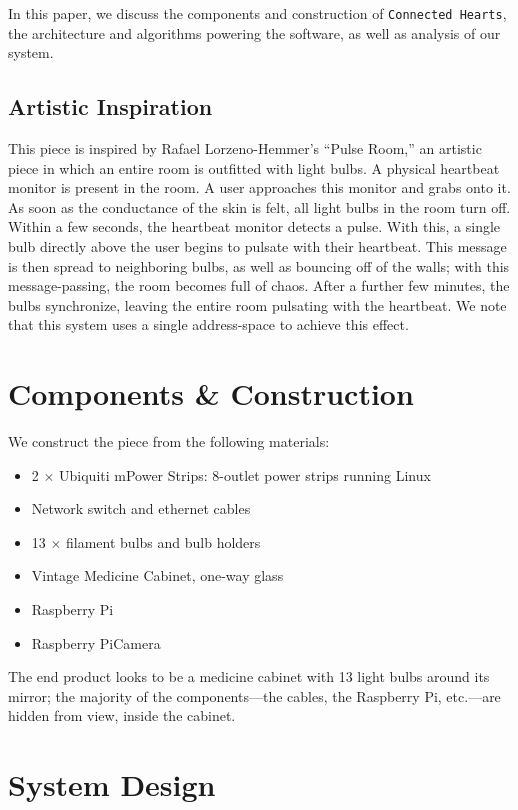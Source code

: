 \documentclass[preprint,review,12pt]{cs262}
\begin{document}
In this paper, we discuss the components and construction of  \texttt{Connected Hearts}, the architecture and algorithms powering the software, as well as analysis of our system. 

\subsection{Artistic Inspiration}

This piece is inspired by Rafael Lorzeno-Hemmer's ``Pulse Room,''\cite{pulse} an artistic piece in which an entire room is outfitted with light bulbs. A physical heartbeat monitor is present in the room. A user approaches this monitor and grabs onto it. As soon as the conductance of the skin is felt, all light bulbs in the room turn off. Within a few seconds, the heartbeat monitor detects a pulse. With this, a single bulb directly above the user begins to pulsate with their heartbeat. This message is then spread to neighboring bulbs, as well as bouncing off of the walls; with this message-passing, the room becomes full of chaos. After a further few minutes, the bulbs synchronize, leaving the entire room pulsating with the heartbeat. We note that this system uses a single address-space to achieve this effect. 


\section{Components \& Construction}

\noindent We construct the piece from the following materials:
\begin{itemize} 
\item 2 $\times$ Ubiquiti mPower Strips: 8-outlet power strips running Linux
\item Network switch and ethernet cables
\item 13 $\times$ filament bulbs and bulb holders
\item Vintage Medicine Cabinet, one-way glass
\item Raspberry Pi
\item Raspberry PiCamera
\end{itemize} 

The end product looks to be a medicine cabinet with 13 light bulbs around its mirror; the majority of the components---the cables, the Raspberry Pi, etc.---are hidden from view, inside the cabinet. 

\section{System Design}
\end{document}
